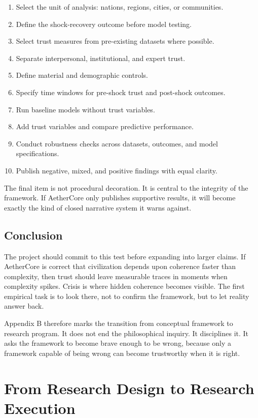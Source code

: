 \documentclass[12pt]{article}
\begin{document}
\begin{enumerate}
  \item Select the unit of analysis: nations, regions, cities, or communities.
  \item Define the shock-recovery outcome before model testing.
  \item Select trust measures from pre-existing datasets where possible.
  \item Separate interpersonal, institutional, and expert trust.
  \item Define material and demographic controls.
  \item Specify time windows for pre-shock trust and post-shock outcomes.
  \item Run baseline models without trust variables.
  \item Add trust variables and compare predictive performance.
  \item Conduct robustness checks across datasets, outcomes, and model specifications.
  \item Publish negative, mixed, and positive findings with equal clarity.
\end{enumerate}

The final item is not procedural decoration. It is central to the integrity of the framework. If AetherCore only publishes supportive results, it will become exactly the kind of closed narrative system it warns against.

\subsection{Conclusion}

The project should commit to this test before expanding into larger claims. If AetherCore is correct that civilization depends upon coherence faster than complexity, then trust should leave measurable traces in moments when complexity spikes. Crisis is where hidden coherence becomes visible. The first empirical task is to look there, not to confirm the framework, but to let reality answer back.

Appendix B therefore marks the transition from conceptual framework to research program. It does not end the philosophical inquiry. It disciplines it. It asks the framework to become brave enough to be wrong, because only a framework capable of being wrong can become trustworthy when it is right.

\section{From Research Design to Research Execution}
\end{document}
